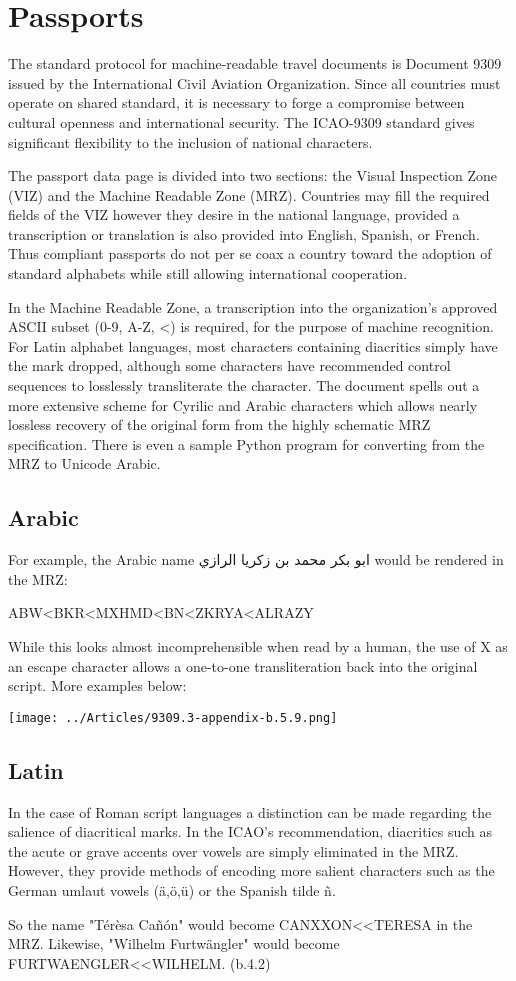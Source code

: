 \section{Passports}

The standard protocol for machine-readable travel documents is Document 9309
issued by the International Civil Aviation Organization. Since all countries
must operate on shared standard, it is necessary to forge a compromise between
cultural openness and international security. The ICAO-9309 standard gives
significant flexibility to the inclusion of national characters.

The passport data page is divided into two sections: the Visual Inspection Zone
(VIZ) and the Machine Readable Zone (MRZ). Countries may fill the required
fields of the VIZ however they desire in the national language, provided a
transcription or translation is also provided into English, Spanish, or French.
Thus compliant passports do not per se coax a country toward the adoption of
standard alphabets while still allowing international cooperation.

In the Machine Readable Zone, a transcription into the organization's approved
ASCII subset (0-9, A-Z, <) is required, for the purpose of machine recognition.
For Latin alphabet languages, most characters containing diacritics simply have
the mark dropped, although some characters have recommended control sequences to
losslessly transliterate the character. The document spells out a more extensive
scheme for Cyrilic and Arabic characters which allows nearly lossless recovery
of the original form from the highly schematic MRZ specification. There is even
a sample Python program for converting from the MRZ to Unicode Arabic.

\subsection{Arabic}

For example, the Arabic name ابو بكر محمد بن زكريا الرازي would be rendered in the MRZ:

ABW<BKR<MXHMD<BN<ZKRYA<ALRAZY

While this looks almost incomprehensible when read by a human, the use of X as
an escape character allows a one-to-one transliteration back into the original
script. More examples below:

\texttt{[image: ../Articles/9309.3-appendix-b.5.9.png]}

\subsection{Latin}

In the case of Roman script languages a distinction can be made regarding the
salience of diacritical marks. In the ICAO's recommendation, diacritics such as
the acute or grave accents over vowels are simply eliminated in the MRZ.
However, they provide methods of encoding more salient characters such as the
German umlaut vowels (ä,ö,ü) or the Spanish tilde ñ.

So the name "Térèsa Cañón" would become CANXXON<<TERESA in the MRZ. Likewise,
"Wilhelm Furtwängler" would become FURTWAENGLER<<WILHELM. (b.4.2)
